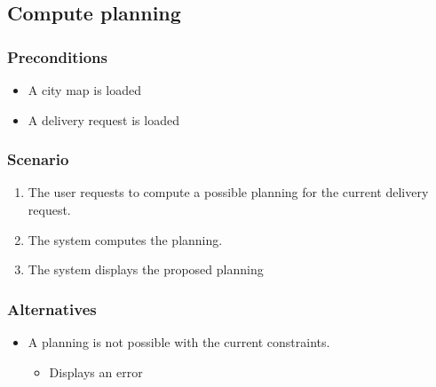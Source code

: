 \subsection{Compute planning}\hypertarget{compute-planning}{}\label{compute-planning}

\subsubsection{Preconditions}\hypertarget{preconditions}{}\label{preconditions}

\begin{itemize}
\item A city map is loaded
\item A delivery request is loaded
\end{itemize}

\subsubsection{Scenario}\hypertarget{scenario}{}\label{scenario}

\begin{enumerate}
\item The user requests to compute a possible planning for the current delivery
request.
\item The system computes the planning.
\item The system displays the proposed planning
\end{enumerate}

\subsubsection{Alternatives}\hypertarget{alternatives}{}\label{alternatives}

\begin{itemize}
\item A planning is not possible with the current constraints.


\begin{itemize}
\item Displays an error
\end{itemize}
\end{itemize}
